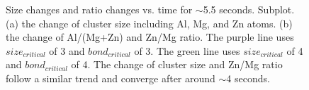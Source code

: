 \begingroup
\begin{figure}[!ht]
  \centering
\caption[Size changes and ratio changes vs. time for $\sim$5.5 seconds. ]{Size changes and ratio changes vs. time for $\sim$5.5 seconds. Subplot. (a) the change of cluster size including Al, Mg, and Zn atoms. (b) the change of Al/(Mg+Zn) and Zn/Mg ratio. The purple line uses $size_{critical}$ of 3 and $bond_{critical}$ of 3. The green line uses $size_{critical}$ of 4 and $bond_{critical}$ of 4. The change of cluster size and Zn/Mg ratio follow a similar trend and converge after around $\sim$4 seconds.}
\label{Chap:Al/Vac:fig:Al_Mg_Zn_benchmark}
\end{figure}
\endgroup



